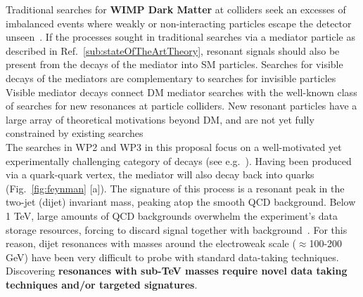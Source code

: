 Traditional searches for \textbf{WIMP Dark Matter} at colliders seek an excesses of imbalanced events where weakly or non-interacting particles escape the detector unseen~\cite{Boveia:2018yeb}. 
If the processes sought in traditional searches via a mediator particle as described in Ref.~\ref{sub:stateOfTheArtTheory}, 
resonant signals should also be present from the decays of the mediator into SM particles.
Searches for visible decays of the mediators are complementary to searches for invisible particles~\cite{CMSSummary,ATLASSummary}  
Visible mediator decays connect DM mediator searches with the well-known class of searches for new resonances at particle colliders. 
New resonant particles have a large array of theoretical motivations beyond DM, and are not yet fully constrained by existing searches~\cite{Kim:2019rhy}%
\\
\indent
The searches in WP2 and WP3 in this proposal focus on a well-motivated yet experimentally challenging category of decays (see e.g.~\cite{Chala:2015ama}). 
Having been produced via a quark-quark vertex, the mediator will also decay back into quarks (Fig.~\ref{fig:feynman} [a]). 
The signature of this process is a resonant peak in the two-jet (dijet) invariant mass, peaking atop the smooth QCD background.
Below 1 TeV, large amounts of QCD backgrounds overwhelm the experiment’s data storage resources, forcing to discard signal together with background~\cite{ToBeCited}. %
For this reason, dijet resonances with masses around the electroweak scale ($\approx$100-200 GeV) have been very difficult to probe with standard data-taking techniques. 
\\
\indent
Discovering \textbf{resonances with sub-TeV masses require novel data taking techniques and/or targeted signatures}. 
